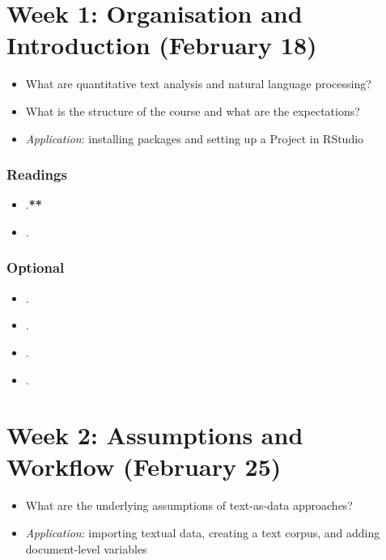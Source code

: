 \documentclass[abstract=on,parskip=full,headings=standardclasses,fontsize=11pt,paper=a4]{scrartcl}
\begin{document}
\tableofcontents

\section{Week 1: Organisation and Introduction (February 18)}

\begin{itemize}
\renewcommand\labelitemi{--}
\item What are quantitative text analysis and natural language processing?
\item What is the structure of the course and what are the expectations?
\item \textit{Application}: installing packages and setting up a Project in RStudio
\end{itemize}

\subsubsection*{Readings}
\begin{itemize}
\item {}.\textbf{**}
\item {}.
\end{itemize}

\subsubsection*{Optional}
\begin{itemize}
\item {}.
\item {}.
\item {}.
\item {}.
\end{itemize}


\section{Week 2: Assumptions and  Workflow (February 25)}

\begin{itemize}
\renewcommand\labelitemi{--}
\item What are the underlying assumptions of text-as-data approaches?
\item \textit{Application}: importing textual data, creating a text corpus, and adding document-level variables
\end{itemize}
\end{document}
